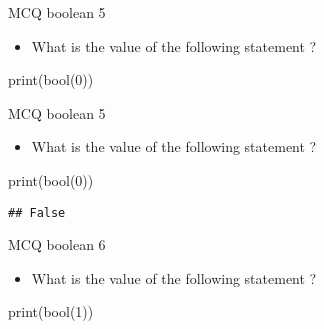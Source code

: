 \documentclass[
  8pt,
  ignorenonframetext,
]{beamer}
\newenvironment{Shaded}{\begin{snugshade}}{\end{snugshade}}
\newcommand{\BuiltInTok}[1]{#1}
\newcommand{\DecValTok}[1]{\textcolor[rgb]{0.00,0.00,0.81}{#1}}
\newcommand{\NormalTok}[1]{#1}
\providecommand{\tightlist}{%
  \setlength{\itemsep}{0pt}\setlength{\parskip}{0pt}}
\begin{document}
\begin{frame}[fragile]{MCQ boolean 5}
\protect\hypertarget{mcq-boolean-5}{}
\begin{itemize}
\tightlist
\item
  What is the value of the following statement ?
\end{itemize}

\begin{Shaded}
\begin{Highlighting}[]
\BuiltInTok{print}\NormalTok{(}\BuiltInTok{bool}\NormalTok{(}\DecValTok{0}\NormalTok{))}
\end{Highlighting}
\end{Shaded}
\end{frame}

\begin{frame}[fragile]{MCQ boolean 5}
\protect\hypertarget{mcq-boolean-5-1}{}
\begin{itemize}
\tightlist
\item
  What is the value of the following statement ?
\end{itemize}

\begin{Shaded}
\begin{Highlighting}[]
\BuiltInTok{print}\NormalTok{(}\BuiltInTok{bool}\NormalTok{(}\DecValTok{0}\NormalTok{))}
\end{Highlighting}
\end{Shaded}

\begin{verbatim}
## False
\end{verbatim}
\end{frame}

\begin{frame}[fragile]{MCQ boolean 6}
\protect\hypertarget{mcq-boolean-6}{}
\begin{itemize}
\tightlist
\item
  What is the value of the following statement ?
\end{itemize}

\begin{Shaded}
\begin{Highlighting}[]
\BuiltInTok{print}\NormalTok{(}\BuiltInTok{bool}\NormalTok{(}\DecValTok{1}\NormalTok{))}
\end{Highlighting}
\end{Shaded}
\end{frame}
\end{document}
